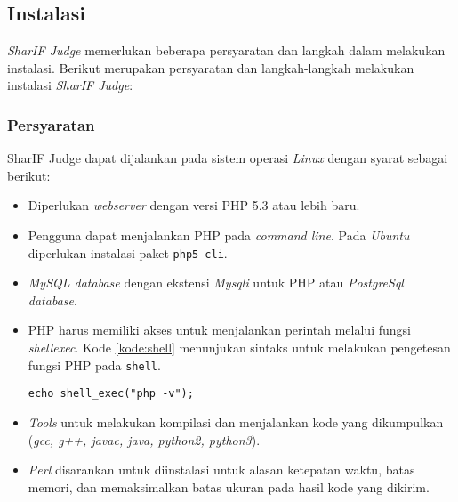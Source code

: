 \subsection{Instalasi}
\label{subsec:instalasi}

\textit{SharIF Judge} memerlukan beberapa persyaratan dan langkah dalam melakukan instalasi. Berikut merupakan persyaratan dan langkah-langkah melakukan instalasi \textit{SharIF Judge}:

\subsubsection{Persyaratan}
\label{subsubsec:persyaratan}
SharIF Judge dapat dijalankan pada sistem operasi \textit{Linux} dengan syarat sebagai berikut:
\begin{itemize}
\item Diperlukan \textit{webserver} dengan versi PHP 5.3 atau lebih baru.
\item Pengguna dapat menjalankan PHP pada \textit{command line}. Pada \textit{Ubuntu} diperlukan instalasi paket \texttt{php5-cli}.
\item \textit{MySQL database} dengan ekstensi \textit{Mysqli} untuk PHP atau \textit{PostgreSql database}.
\item PHP harus memiliki akses untuk menjalankan perintah melalui fungsi \textit{shell\textunderscore exec}. Kode \ref{kode:shell} menunjukan sintaks untuk melakukan pengetesan fungsi PHP pada \texttt{shell}.

\begin{lstlisting}[caption=Kode untuk melakukah pengetesan fungsi, label=kode:shell]
	echo shell_exec("php -v");
\end{lstlisting}

\item \textit{Tools} untuk melakukan kompilasi dan menjalankan kode yang dikumpulkan (\textit{gcc, g++, javac, java, python2, python3}).
\item \textit{Perl} disarankan untuk diinstalasi untuk alasan ketepatan waktu, batas memori, dan memaksimalkan batas ukuran pada hasil kode yang dikirim.
\end{itemize}

